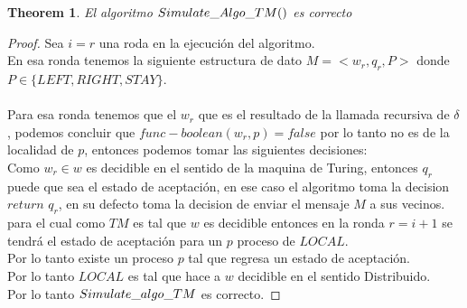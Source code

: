 \documentclass[10pt]{article}
\newtheorem{theorem}{Theorem}[section]
\begin{document}
    \begin{theorem}
        El algoritmo $Simulate\char95 Algo\char95 TM()$ es correcto
    \end{theorem}
    \begin{proof}
        Sea $i=r$ una roda en la ejecución del algoritmo.\\
        En esa ronda tenemos la siguiente estructura de dato $M = <w_{r}, q_{r}, P>$ donde \\
        $P\in \{LEFT,RIGHT,STAY\}$.\\\\
        Para esa ronda tenemos que el $w_{r}$ que es el resultado de la
        llamada recursiva de $\delta$, podemos concluir que $func-boolean(w_{r},p) = false $
        por lo tanto no es de la localidad de $p$, entonces podemos tomar las siguientes decisiones:\\
        Como $w_{r}\in w$ es decidible en el sentido de la maquina de Turing, entonces $q_{r}$ puede que
        sea el estado de aceptación, en ese caso el algoritmo toma la decision $return$ $ q_{r}$, en su defecto
        toma la decision de enviar el mensaje $M$ a sus vecinos.
        para el cual como $TM$ es tal que $w$ es decidible entonces en la ronda $r=i+1$ se tendrá el estado de aceptación
        para un $p$ proceso de $LOCAL$.\\
        Por lo tanto existe un proceso $p$ tal que regresa un estado de aceptación.\\
        Por lo tanto $LOCAL$ es tal que hace a $w$ decidible en el sentido Distribuido.\\
        Por lo tanto $Simulate\char95 algo\char95 TM$ es correcto.
        \end{proof}
\end{document}
